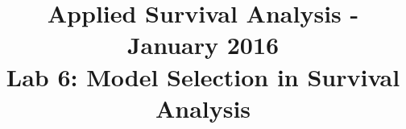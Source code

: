 \documentclass[11pt,a4paper]{article}
\begin{document}
\title{Applied Survival Analysis - January 2016\\Lab 6: Model Selection in Survival Analysis}
\date{\vspace{-10ex}}
\author{\vspace{-10ex}}
\maketitle

\end{document}
